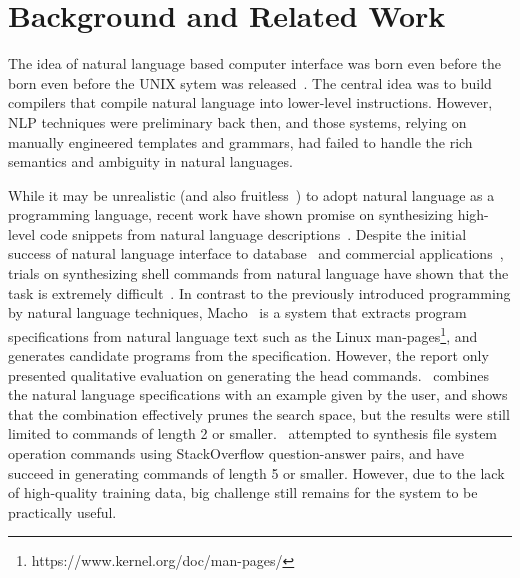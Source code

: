 \section{Background and Related Work}
The idea of natural language based computer interface was born even before the born even before the UNIX sytem was released~\cite{sammet1966use,Ballard:1979:PNL:800177.810072}. The central idea was to build compilers that compile natural language into lower-level instructions. However, NLP techniques were preliminary back then, and those systems, relying on manually engineered templates and grammars, had failed to handle the rich semantics and ambiguity in natural languages. 

While it may be unrealistic (and also fruitless~\cite{Dijkstra:1978:FNL:647639.760596}) to adopt natural language as a programming language, recent work have shown promise on synthesizing high-level code snippets from natural language descriptions~\cite{gulwani2010dimensions,DBLP:journals/corr/DesaiGHJKMRR15}.  
Despite the initial success of natural language interface to database~\cite{Popescu:2003:TTN:604045.604070,DBLP:journals/pvldb/LiJ14} and commercial applications~\cite{DBLP:conf/mobisys/LeGS13,DBLP:conf/acl/QuirkMG15}, trials on synthesizing shell commands from natural language have shown that the task is extremely difficult~\cite{bashsynthesis,cozzie2011macho,cozzie2012macho,Pedersen-Report}. In contrast to the previously introduced programming by natural language techniques, Macho~\cite{cozzie2011macho} is a system that extracts program specifications from natural language text such as the Linux man-pages\footnote{https://www.kernel.org/doc/man-pages/}, and generates candidate programs from the specification. However, the report only presented qualitative evaluation on generating the head commands.~\cite{cozzie2012macho} combines the natural language specifications with an example given by the user, and shows that the combination effectively prunes the search space, but the results were still limited to commands of length 2 or smaller.~\cite{bashsynthesis} attempted to synthesis file system operation commands using StackOverflow question-answer pairs, and have succeed in generating commands of length 5 or smaller. However, due to the lack of high-quality training data, big challenge still remains for the system to be practically useful.

